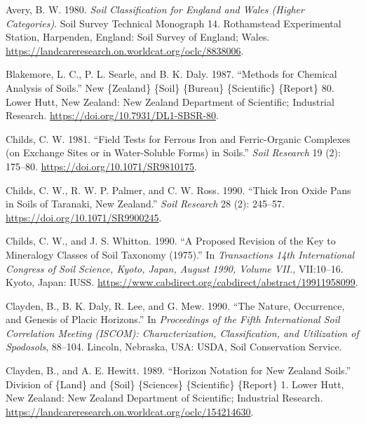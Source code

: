 \documentclass[
  letterpaper,
  DIV=11,
  numbers=noendperiod]{scrreprt}
\newlength{\cslhangindent}
\newlength{\cslentryspacingunit} %
\newenvironment{CSLReferences}[2] %
 {%
  \setlength{\parindent}{0pt}
  \ifodd #1
  \let\oldpar\par
  \def\par{\hangindent=\cslhangindent\oldpar}
  \fi
  \setlength{\parskip}{#2\cslentryspacingunit}
 }%
 {}
\begin{document}
\hypertarget{refs}{}
\begin{CSLReferences}{1}{0}
\leavevmode{}%
Avery, B. W. 1980. \emph{Soil {Classification} for {England} and {Wales}
({Higher} {Categories})}. Soil {Survey} {Technical} {Monograph} 14.
Rothamstead Experimental Station, Harpenden, England: Soil Survey of
England; Wales.
\url{https://landcareresearch.on.worldcat.org/oclc/8838006}.

\leavevmode{}%
Blakemore, L. C., P. L. Searle, and B. K. Daly. 1987. {``Methods for
Chemical Analysis of Soils.''} New \{Zealand\} \{Soil\} \{Bureau\}
\{Scientific\} \{Report\} 80. Lower Hutt, New Zealand: New Zealand
Department of Scientific; Industrial Research.
\url{https://doi.org/10.7931/DL1-SBSR-80}.

\leavevmode{}%
Childs, C. W. 1981. {``Field Tests for Ferrous Iron and Ferric-Organic
Complexes (on Exchange Sites or in Water-Soluble Forms) in Soils.''}
\emph{Soil Research} 19 (2): 175--80.
\url{https://doi.org/10.1071/SR9810175}.

\leavevmode{}%
Childs, C. W., R. W. P. Palmer, and C. W. Ross. 1990. {``Thick Iron
Oxide Pans in Soils of {Taranaki}, {New} {Zealand}.''} \emph{Soil
Research} 28 (2): 245--57. \url{https://doi.org/10.1071/SR9900245}.

\leavevmode{}%
Childs, C. W., and J. S. Whitton. 1990. {``A Proposed Revision of the
Key to Mineralogy Classes of {Soil} {Taxonomy} (1975).''} In
\emph{Transactions 14th {International} {Congress} of {Soil} {Science},
{Kyoto}, {Japan}, {August} 1990, {Volume} {VII}.}, VII:10--16. Kyoto,
Japan: IUSS.
\url{https://www.cabdirect.org/cabdirect/abstract/19911958099}.

\leavevmode{}%
Clayden, B., B. K. Daly, R. Lee, and G. Mew. 1990. {``The {Nature},
{Occurrence}, and {Genesis} of {Placic} {Horizons}.''} In
\emph{Proceedings of the {Fifth} {International} {Soil} {Correlation}
{Meeting} ({ISCOM}): {Characterization}, {Classification}, and
{Utilization} of {Spodosols}}, 88--104. Lincoln, Nebraska, USA: USDA,
Soil Conservation Service.

\leavevmode{}%
Clayden, B., and A. E. Hewitt. 1989. {``Horizon Notation for {New}
{Zealand} {Soils}.''} Division of \{Land\} and \{Soil\} \{Sciences\}
\{Scientific\} \{Report\} 1. Lower Hutt, New Zealand: New Zealand
Department of Scientific; Industrial Research.
\url{https://landcareresearch.on.worldcat.org/oclc/154214630}.


\end{CSLReferences}
\end{document}
